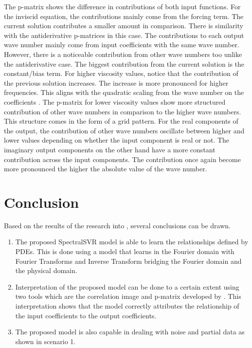 \documentclass[preprint,12pt,times,authoryear]{elsarticle}
\begin{document}
The p-matrix shows the difference in contributions of both input functions. For the inviscid equation, the contributions mainly come from the forcing term. The current solution contributes a smaller amount in comparison. There is similarity with the antiderivative p-matrices in this case. The contributions to each output wave number mainly come from input coefficients with the same wave number. However, there is a noticeable contribution from other wave numbers too unlike the antiderivative case. The biggest contribution from the current solution is the constant/bias term. For higher viscosity values, notice that the contribution of the previous solution increases. The increase is more pronounced for higher frequencies. This aligns with the quadratic scaling from the wave number on the coefficients \citep{canutoSpectralMethodsEvolution2007}. The p-matrix for lower viscosity values show more structured contribution of other wave numbers in comparison to the higher wave numbers. This structure comes in the form of a grid pattern. For the real components of the output, the contribution of other wave numbers oscillate between higher and lower values depending on whether the input component is real or not. The imaginary output components on the other hand have a more constant contribution across the input components. The contribution once again become more pronounced the higher the absolute value of the wave number.
\section{Conclusion}
\noindent Based on the results of the research into \MakeLowercase{\judul}, several conclusions can be drawn.
\begin{enumerate}
  \item The proposed SpectralSVR model is able to learn the relationships defined by PDEs. This is done using a model that learns in the Fourier domain with Fourier Transforms and Inverse Transform bridging the Fourier domain and the physical domain.
  \item Interpretation of the proposed model can be done to a certain extent using two tools which are the correlation image and p-matrix developed by \citet{alisationInterpretationSupport2007}. This interpretation shows that the model correctly attributes the relationship of the input coefficients to the output coefficients.
  \item The proposed model is also capable in dealing with noise and partial data as shown in scenario 1.
\end{enumerate}
\end{document}
